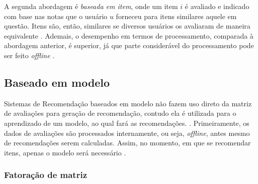             A segunda abordagem é \textit{baseada em item}, onde um item $i$ é avaliado e indicado com base nas notas que o usuário $u$ forneceu para itens similares aquele em questão. Itens são, então, similares se diversos usuários os avaliaram de maneira equivalente \cite{Ricci2010}. Ademais, o desempenho em termos de processamento, comparada à abordagem anterior, é superior, já que parte considerável do processamento pode ser feito \textit{offline} \cite{Jannach2010, Miranda2010}.
            
                        
    
    
    \subsection{Baseado em modelo}

        Sistemas de Recomendação baseados em modelo  não fazem uso direto da matriz de avaliações para geração de recomendação, contudo ela é utilizada para o aprendizado de um modelo, ao qual fará as recomendações. \cite{Adomavicius2005}. Primeiramente, os dados de avaliações são processados internamente, ou seja, \textit{offline}, antes mesmo de  recomendações serem calculadas. Assim, no momento, em que se recomendar itens, apenas o modelo será necessário \cite{Jannach2010}.
        
        \subsubsection{Fatoração de matriz}
        
